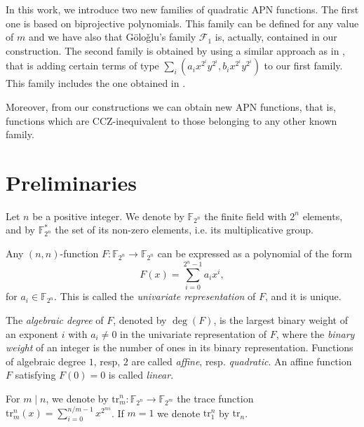 \documentclass{article}
\newcommand{\cF}{\mathcal{F}}
\begin{document}
In this work, we introduce two new families of quadratic APN functions. The first one is based on biprojective polynomials. This family can be defined for any value of $m$ and we have also that G\"olo\v{g}lu's family $\cF_1$ is, actually, contained in our construction. 
The second family is obtained by using a similar approach as in \cite{LZLQ}, that is adding certain terms of type $\sum_i(a_ix^{2^i}y^{2^i},b_ix^{2^i}y^{2^i})$ to our first family. This family includes the one obtained in \cite{LZLQ}.

Moreover, from our constructions we can obtain new APN functions, that is, functions which are CCZ-inequivalent to those belonging to any other known family.



\section{Preliminaries}

Let $n$ be a positive integer. We denote by $\mathbb{F}_{2^n}$ the finite field with $2^n$ elements, and by $\mathbb{F}_{2^n}^*$ the set of its non-zero elements, i.e. its multiplicative group.



Any $(n,n)$-function $F : \mathbb{F}_{2^n} \rightarrow \mathbb{F}_{2^n}$ can be expressed as a polynomial of the form $$F(x) = \sum_{i = 0}^{2^n-1} a_i x^i,$$ for $a_i \in \mathbb{F}_{2^n}$. This is called the \textit{univariate representation} of $F$, and it is unique.


The \textit{algebraic degree} of $F$, denoted by $\deg(F)$, is the largest binary weight of an exponent $i$ with $a_i \ne 0$ in the univariate representation of $F$, where the \textit{binary weight} of an integer is the number of ones in its binary representation. Functions of algebraic degree $1$, resp, $2$ are called \textit{affine}, resp. \textit{quadratic}. An affine function $F$ satisfying $F(0) = 0$ is called \textit{linear}.

For $m \mid n$, we denote by $\mathrm{tr}^n_m : \mathbb{F}_{2^n} \rightarrow \mathbb{F}_{2^m}$ the trace function $\mathrm{tr}^n_m(x) = \sum_{i = 0}^{n/m - 1} x^{2^{mi}}$. If $m=1$ we  denote  $\mathrm{tr}^n_1$ by $\mathrm{tr}_n$.
\end{document}
